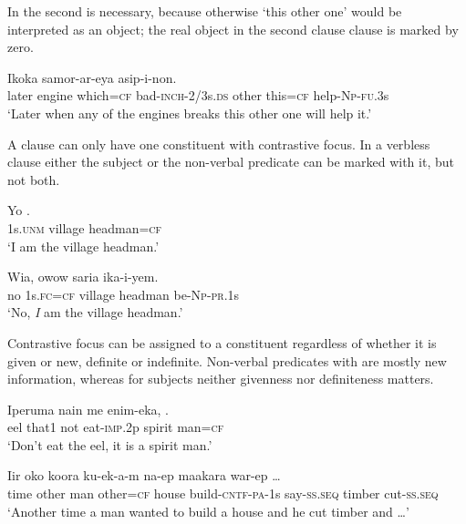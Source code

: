 In  the second  is necessary, because otherwise `this other one' would be interpreted as an object; the real object in the second clause clause is marked by zero.

\ea%
\label{ex:9:x1706}
\gll Ikoka     samor-ar-eya    asip-i-non.\\
later  engine  which=\textsc{cf}  bad-\textsc{inch}-2/3s.\textsc{ds}  other  this=\textsc{cf} help-\textsc{Np}-\textsc{fu}.3s \\
\glt`Later when any of the engines breaks this other one will help it.'
\z


A clause can only have one constituent with contrastive focus. In a verbless clause  either the subject or the non-verbal predicate can be marked with it, but not both.

\ea%
\label{ex:9:x1707}
\gll Yo   .\\
1s.\textsc{unm}  village  headman=\textsc{cf}\\
\glt`I am the village headman.'
\z


\ea%
\label{ex:9:x1708}
\gll Wia,    owow  saria  ika-i-yem. \\
no  1s.\textsc{fc}=\textsc{cf}  village  headman  be-\textsc{Np}-\textsc{pr}.1s      \\
\glt`No, \textit{I} am the village headman.'
\z


Contrastive focus can be assigned to a constituent regardless of whether it is given or new, definite or indefinite. Non-verbal predicates with  are mostly new information, whereas for subjects neither givenness nor definiteness matters.

\ea%
\label{ex:9:x1709}
\gll Iperuma  nain  me  enim-eka,   .\\
eel  that1  not  eat-\textsc{imp}.2p  spirit  man=\textsc{cf}\\
\glt`Don't eat the eel, it is a spirit man.'
\z


\ea%
\label{ex:9:x1710}
\gll Iir  oko     koora  ku-ek-a-m  na-ep maakara  war-ep  {\dots}\\
time  other  man  other=\textsc{cf}  house  build-\textsc{cntf}-\textsc{pa}-1s  say-\textsc{ss}.\textsc{seq} timber  cut-\textsc{ss}.\textsc{seq}\\
\glt`Another time a man wanted to build a house and he cut timber and {\dots}'
\z



